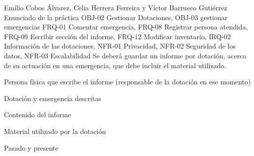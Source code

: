 {Emilio Cobos Álvarez, Celia Herrera Ferreira y Víctor Barrueco Gutiérrez}
{Enunciado de la práctica}
{OBJ-02 Gestionar Dotaciones, OBJ-03 gestionar emergencias}
{FRQ-01 Comentar emergencia, FRQ-08 Registrar persona atendida, FRQ-09 Escribir sección del informe, FRQ-12 Modificar inventario, IRQ-02 Información de las dotaciones, NFR-01 Privacidad, NFR-02 Seguridad de los datos, NFR-03 Escalabilidad}
{Se deberá guardar un informe por dotación, acerca de su actuación en una emergencia, que debe incluir el material utilizado.}
{
\item{Persona física que escribe el informe (responsable de la dotación en ese momento)}
\item{Dotación y emergencia descritas}
\item{Contenido del informe}
\item{Material utilizado por la dotación}
}
{Pasado y presente}

